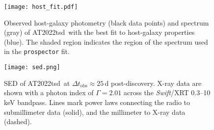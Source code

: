 \documentclass{nature_plusfigure}
\newcommand{\at}{AT2022tsd}
\begin{document}
\begin{supplement}
\begin{figure}[!ht]
 \centering
\texttt{[image: host\_fit.pdf]}
  \caption{Observed host-galaxy photometry (black data points) and spectrum (gray) of \at\ with the best fit to host-galaxy properties (blue). The shaded region indicates the region of the spectrum used in the \texttt{prospector} fit.
}
 \label{fig:host-fit}
\end{figure}

\begin{figure}[!ht]
 \centering
\texttt{[image: sed.png]}
  \caption{SED of \at\ at $\Delta t_\mathrm{obs}\approx25\,$d post-discovery. X-ray data are shown with a photon index of $\Gamma=2.01$ across the {\it Swift}/XRT 0.3--10\,keV bandpass. Lines mark power laws connecting the radio to submillimeter data (solid), and the millimeter to X-ray data (dashed).}
 \label{fig:full-sed}
\end{figure}


\end{supplement}
\end{document}
